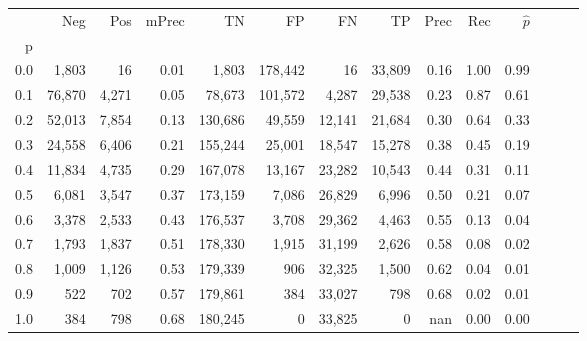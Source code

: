 \begin{tabular}{rrrrrrrrrrrrrr}
\toprule
{} &     Neg &    Pos & mPrec &       TN &       FP &      FN &      TP &  Prec &   Rec & $\hat{p}$ \\
p   &         &        &       &          &          &         &         &       &       &           \\
\midrule
0.0 &   1,803 &     16 &  0.01 &    1,803 &  178,442 &      16 &  33,809 &  0.16 &  1.00 &      0.99 \\
0.1 &  76,870 &  4,271 &  0.05 &   78,673 &  101,572 &   4,287 &  29,538 &  0.23 &  0.87 &      0.61 \\
0.2 &  52,013 &  7,854 &  0.13 &  130,686 &   49,559 &  12,141 &  21,684 &  0.30 &  0.64 &      0.33 \\
0.3 &  24,558 &  6,406 &  0.21 &  155,244 &   25,001 &  18,547 &  15,278 &  0.38 &  0.45 &      0.19 \\
0.4 &  11,834 &  4,735 &  0.29 &  167,078 &   13,167 &  23,282 &  10,543 &  0.44 &  0.31 &      0.11 \\
0.5 &   6,081 &  3,547 &  0.37 &  173,159 &    7,086 &  26,829 &   6,996 &  0.50 &  0.21 &      0.07 \\
0.6 &   3,378 &  2,533 &  0.43 &  176,537 &    3,708 &  29,362 &   4,463 &  0.55 &  0.13 &      0.04 \\
0.7 &   1,793 &  1,837 &  0.51 &  178,330 &    1,915 &  31,199 &   2,626 &  0.58 &  0.08 &      0.02 \\
0.8 &   1,009 &  1,126 &  0.53 &  179,339 &      906 &  32,325 &   1,500 &  0.62 &  0.04 &      0.01 \\
0.9 &     522 &    702 &  0.57 &  179,861 &      384 &  33,027 &     798 &  0.68 &  0.02 &      0.01 \\
1.0 &     384 &    798 &  0.68 &  180,245 &        0 &  33,825 &       0 &   nan &  0.00 &      0.00 \\
\bottomrule
\end{tabular}
